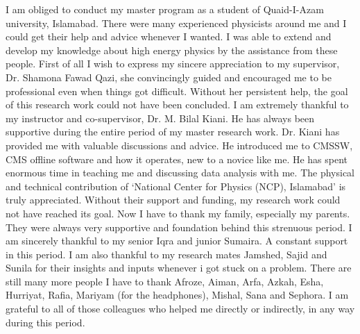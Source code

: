 \vskip 0.2in
I am obliged to conduct my master program as a student of Quaid-I-Azam university, Islamabad. There were many experienced physicists around me and I could get their help and advice whenever I wanted. I was able to extend and develop my knowledge about high energy physics by the assistance from these people.
\newline
First of all I wish to express my sincere appreciation to my supervisor, Dr. Shamona Fawad Qazi, she convincingly guided and encouraged me to be professional even when things got difficult. Without her persistent help, the goal of this research work could not have been concluded.
\newline
I am extremely thankful to my instructor and co-supervisor, Dr. M. Bilal Kiani. He has always been supportive during the entire period of my master research work. Dr. Kiani has provided me with valuable discussions and advice. He introduced me to CMSSW, CMS offline software and how it operates, new to a novice like me. He has spent enormous time in teaching me and discussing data analysis with me.
\newline
The physical and technical contribution of ‘National Center for Physics (NCP), Islamabad’ is truly appreciated. Without their support and funding, my research work could not have reached its goal.
\newline
Now I have to thank my family, especially my parents. They were always very supportive and foundation behind this strenuous period.
\newline 
I am sincerely thankful to my senior Iqra and junior Sumaira. A constant support in this period.
\newline
I am also thankful to my research mates Jamshed, Sajid and Sunila for their insights and inputs whenever i got stuck on a problem.
\newline
There are still many more people I have to thank Afroze, Aiman, Arfa, Azkah, Esha, Hurriyat, Rafia, Mariyam (for the headphones), Mishal, Sana and Sephora. I am grateful to all of those colleagues who helped me directly or indirectly, in any way during this period.